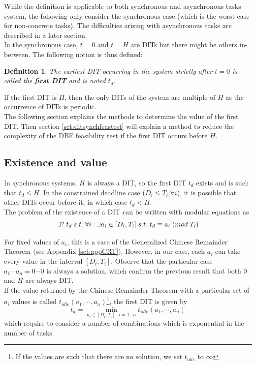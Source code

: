 \documentclass[a4paper,10pt]{article}
\newtheorem{definition}{Definition}
\begin{document}
While the definition is applicable to both synchronous and asynchronous tasks system, the following only consider the synchronous case (which is the worst-case for non-concrete tasks). The difficulties arising with asynchronous tasks are described in a later section.\\

In the synchronous case, $t=0$ and $t=H$ are DITs but there might be others in-between. The following notion is thus defined:

\begin{definition}
The earliest DIT occurring in the system strictly after $t=0$ is called the \textbf{first DIT} and is noted $t_d$.
\end{definition}

If the first DIT is $H$, then the only DITs of the system are multiple of $H$ as the occurrence of DITs is periodic.\\

The following section explains the methods to determine the value of the first DIT. Then section \ref{sct:ditsynchfeastest} will explain a method to reduce the complexity of the DBF feasibility test if the first DIT occurs before $H$.

\subsection{Existence and value}

In synchronous systems, $H$ is always a DIT, so the first DIT $t_d$ exists and is such that $t_d \leq H$. In the constrained deadline case ($D_i \leq T_i \; \forall i$), it is possible that other DITs occur before it, in which case $t_d < H$.\\

The problem of the existence of a DIT can be written with modular equations as
$$
\exists ? \; t_d \; s.t. \; \forall i : \exists a_i \in [D_i, T_i] \; s.t. \; t_d \equiv a_i \; (mod \; T_i) \\
$$

For fixed values of $a_i$, this is a case of the Generalized Chinese Remainder Theorem (see Appendix \ref{sct:appCRT}). However, in our case, each $a_i$ can take every value in the interval $[D_i, T_i]$. Observe that the particular case $a_1 \cdots a_n = 0 \cdots 0$ is always a solution, which confirm the previous result that both 0 and $H$ are always DIT.\\

If the value returned by the Chinese Remainder Theorem with a particular set of $a_i$ values is called $t_{idle} (a_1, \cdots, a_n)$\footnote{If the values are such that there are no solution, we set $t_{idle}$ to $\infty$}, the first DIT is given by $$t_d = \operatorname*{min}_{a_i \in [D_i, T_i], \; i = 1 \cdots n} t_{idle} (a_1, \cdots, a_n)$$ which require to consider a number of combinations which is exponential in the number of tasks.
\end{document}
